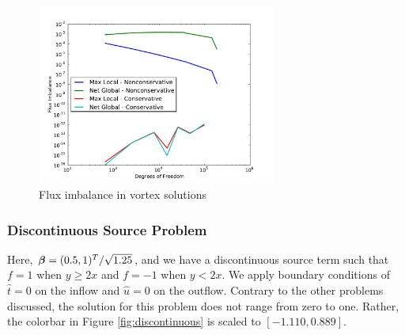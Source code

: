 \documentclass[Proposal.tex]{subfiles}
\begin{document}
\begin{figure}[p]
\centering
\includegraphics[width=0.7\textwidth]{figs/Vortex/modifiedFlux.pdf}
\caption{Flux imbalance in vortex solutions}
\label{fig:vortex_flux}
\end{figure}

\subsubsection{Discontinuous Source Problem}
Here, $\boldsymbol\beta=(0.5,1)^T/\sqrt{1.25}$, and we have a discontinuous source term
such that $f=1$ when $y\ge2x$ and $f=-1$ when $y<2x$. We apply boundary
conditions of $\hat t=0$ on the inflow and $\hat u=0$ on the outflow. Contrary
to the other problems discussed, the solution for this problem does not range
from zero to one. Rather, the colorbar in Figure \ref{fig:discontinuous} is
scaled to  $[-1.110,0.889]$.
\end{document}
